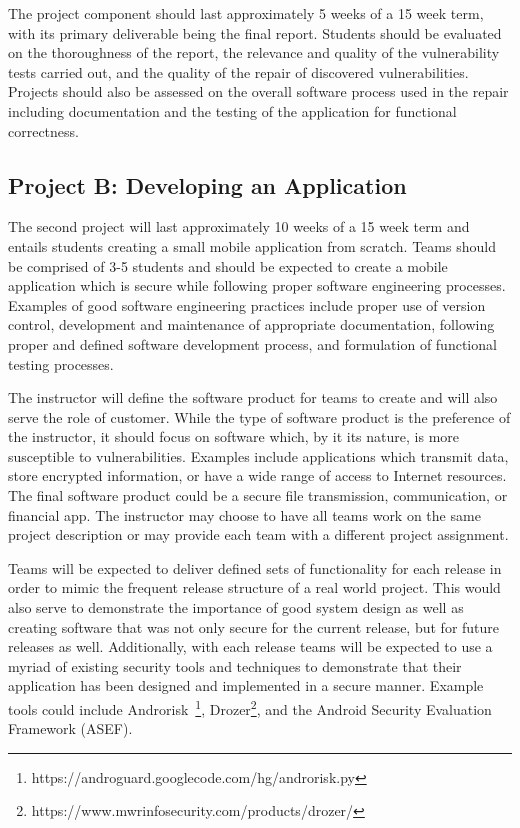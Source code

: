 \documentclass[conference]{IEEEtran}
\begin{document}
The project component should last approximately 5 weeks of a 15 week term, with its primary deliverable being the final report. Students should be evaluated on the thoroughness of the report, the relevance and quality of the vulnerability tests carried out, and the quality of the repair of discovered vulnerabilities. Projects should also be assessed on the overall software process used in the repair including documentation and the testing of the application for functional correctness.

\subsection{Project B: Developing an Application}

The second project will last approximately 10 weeks of a 15 week term and entails students creating a small mobile application from scratch. Teams should be comprised of 3-5 students and should be expected to create a mobile application which is secure while following proper software engineering processes. Examples of good software engineering practices include proper use of version control, development and maintenance of appropriate documentation, following proper and defined software development process, and formulation of functional testing processes.

The instructor will define the software product for teams to create and will also serve the role of customer. While the type of software product is the preference of the instructor, it should focus on software which, by it its nature, is more susceptible to vulnerabilities. Examples include applications which transmit data, store encrypted information, or have a wide range of access to Internet resources. The final software product could be a secure file transmission, communication, or financial app. The instructor may choose to have all teams work on the same project description or may provide each team with a different project assignment.

Teams will be expected to deliver defined sets of functionality for each release in order to mimic the frequent release structure of a real world project. This would also serve to demonstrate the importance of good system design as well as creating software that was not only secure for the current release, but for future releases as well. Additionally, with each release teams will be expected to use a myriad of existing security tools and techniques to demonstrate that their application has been designed and implemented in a secure manner.  Example tools could include Androrisk~\footnote{https://androguard.googlecode.com/hg/androrisk.py}, Drozer\footnote{https://www.mwrinfosecurity.com/products/drozer/}, and the Android Security Evaluation Framework (ASEF).
\end{document}
